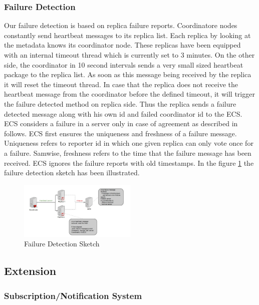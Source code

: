 \documentclass{sig-alternate}
\begin{document}
\subsubsection{Failure Detection}
Our failure detection is based on replica failure reports. Coordinatore nodes 
constantly send heartbeat messages to its replica list. Each replica by looking at the metadata knows its coordinator node. These replicas have been equipped with an internal timeout thread which is currently set to 3 minutes. On the other side, the coordinator in 10 second intervals sends a very small sized heartbeat package to the replica list. As soon as this message being received by the replica  it will reset the timeout thread. In case that the replica does not receive the heartbeat message from the coordinator before the defined timeout, it will trigger the failure   detected method on replica side. Thus the replica sends a failure detected message along with his own id and failed coordinator id to the ECS. 
ECS considers a failure in a server only in case of agreement as described in follows. ECS first ensures the uniqueness and freshness of a failure message. Uniqueness refers to reporter id in which one given replica can only vote once for a failure. Samwise, freshness refers to the time that the failure message has been received. ECS ignores the failure reports with old timestamps.
In the figure \ref{failuredetection} the failure detection sketch has been illustrated.


\begin{center}
\begin{figure}[ht!]
\centering
     \includegraphics[width=0.5\textwidth]{FailureDetection.jpg}
\caption{Failure Detection Sketch \label{failuredetection}}
\end{figure}
\end{center}

\subsection{Extension}
\subsubsection{Subscription/Notification System}
\end{document}
